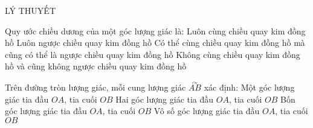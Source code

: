 \begin{dang}
  {LÝ THUYẾT} 
\end{dang}


\begin{ex}%
Quy ước chiều dương của một góc lượng giác là:
\choice
{Luôn cùng chiều quay kim đồng hồ}
{\True Luôn ngược chiều quay kim đồng hồ}
{Có thể cùng chiều quay kim đồng hồ mà cũng có thể là ngược chiều quay kim đồng hồ}
{Không cùng chiều quay kim đồng hồ và cũng không ngược chiều quay kim đồng hồ}
\loigiai{
}
\end{ex}

\begin{ex}%
Trên đường tròn lượng giác, mỗi cung lượng giác $\overset{\curvearrowright}{AB}$ xác định:
\choice
{Một góc lượng giác tia đầu $OA$, tia cuối $OB$}
{Hai góc lượng giác tia đầu $OA$, tia cuối $OB$}
{Bốn góc lượng giác tia đầu $OA$, tia cuối $OB$}
{\True Vô số góc lượng giác tia đầu $OA$, tia cuối $OB$}
\loigiai{
}
\end{ex}


